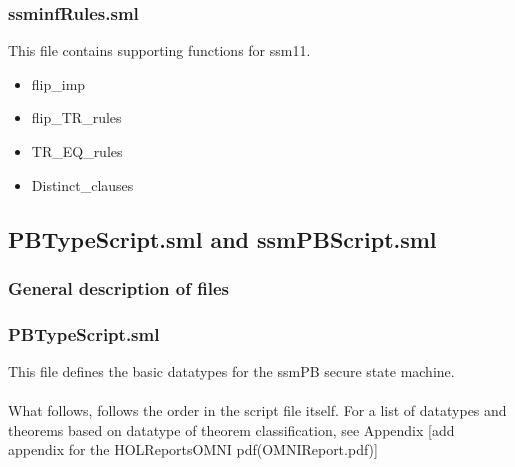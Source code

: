 \subsubsection{ssminfRules.sml}
\label{sec:ssminfrules.sml}

This file contains supporting functions for ssm11.

\begin{itemize}
\item flip_imp
\item flip_TR_rules
\item TR_EQ_rules
\item Distinct_clauses
  \end{itemize}

\subsection{PBTypeScript.sml and ssmPBScript.sml}
\label{sec:pbtyp-ssmpbscr}

\subsubsection{General description of files}
\label{sec:gener-descr-files-1}

\subsubsection{PBTypeScript.sml}
\label{sec:pbtypescript.sml}

This file defines the basic datatypes for the ssmPB secure state machine.\\\\
What follows, follows the order in the script file itself. For a list of datatypes
and theorems based on datatype of theorem classification, see Appendix [add appendix
for the HOLReportsOMNI pdf(OMNIReport.pdf)]

